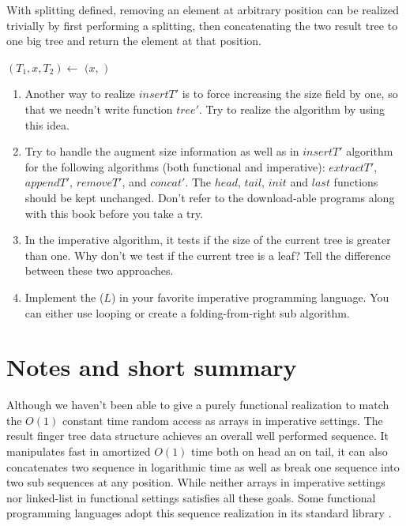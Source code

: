 \documentclass[b5paper]{article}
\begin{document}
With splitting defined, removing an element at arbitrary position can be realized trivially
by first performing a splitting, then concatenating the two result tree to one big tree and return
the element at that position.

\begin{algorithmic}
  \State $(T_1, x, T_2) \gets$ 
  \State \Return $(x, $  $)$
\EndFunction
\end{algorithmic}

\begin{Exercise}
\begin{enumerate}
\item Another way to realize $insertT'$ is to force increasing the size field by one, so
that we needn't write function $tree'$. Try to realize the algorithm by using this idea.

\item Try to handle the augment size information as well as in $insertT'$ algorithm for
the following algorithms (both functional and imperative): $extractT'$, $appendT'$, $removeT'$, and $concat'$. The $head$, $tail$,
$init$ and $last$ functions should be kept unchanged. Don't refer to the download-able
programs along with this book before you take a try.

\item In the imperative  algorithm, it tests if the size of the
current tree is greater than one. Why don't we test if the current tree is
a leaf? Tell the difference between these two approaches.

\item Implement the ($L$) in your favorite imperative programming language.
You can either use looping or create a folding-from-right sub algorithm.
\end{enumerate}
\end{Exercise}

\section{Notes and short summary}

Although we haven't been able to give a purely functional realization to match the
$O(1)$ constant time random access as arrays in imperative settings. The result
finger tree data structure achieves an overall well performed sequence.
It manipulates fast in amortized $O(1)$ time both on head an on tail, it can also
concatenates two sequence in logarithmic time as well as break one sequence into
two sub sequences at any position. While neither arrays in imperative settings
nor linked-list in functional settings satisfies all these goals.
Some functional programming languages adopt this sequence realization in its
standard library \cite{hackage-ftr}.
\end{document}
